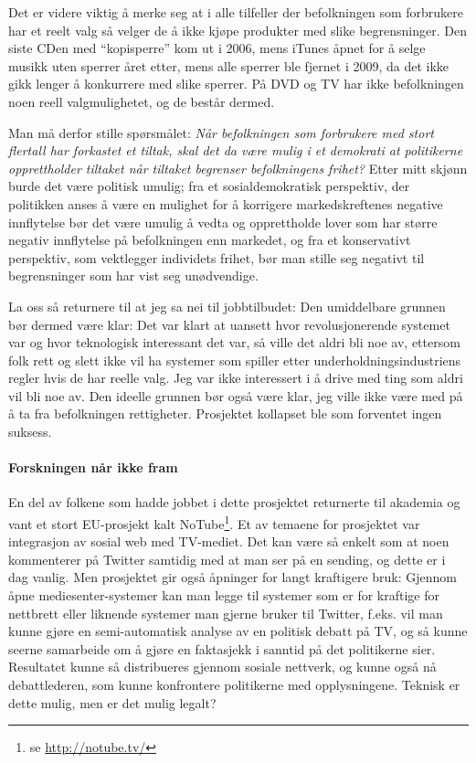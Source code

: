 \documentclass[11pt,norsk,a4paper]{article}
\begin{document}
Det er videre viktig å merke seg at i alle tilfeller der befolkningen
som forbrukere har et reelt valg så velger de å ikke kjøpe produkter
med slike begrensninger. Den siste CDen med ``kopisperre'' kom ut i
2006\cite{aftkopi}, mens iTunes åpnet for å selge musikk uten sperrer året etter,
mens alle sperrer ble fjernet i 2009\cite{ituneskopi}, da det ikke gikk lenger å
konkurrere med slike sperrer. På DVD og TV har
ikke befolkningen noen reell valgmulighetet, og de består dermed.

Man må derfor stille spørsmålet: \emph{Når befolkningen som forbrukere med
stort flertall har forkastet et tiltak, skal det da være mulig i et
demokrati at politikerne opprettholder tiltaket når tiltaket begrenser
befolkningens frihet?} Etter mitt skjønn burde det være politisk
umulig; fra et sosialdemokratisk perspektiv, der politikken anses å
være en mulighet for å korrigere markedskreftenes negative innflytelse
bør det være umulig å vedta og opprettholde lover som har større
negativ innflytelse på befolkningen enn markedet, og fra et
konservativt perspektiv, som vektlegger individets frihet, bør man
stille seg negativt til begrensninger som har vist seg unødvendige.

La oss så returnere til at jeg sa nei til jobbtilbudet: Den
umiddelbare grunnen bør dermed være klar: Det var klart at uansett
hvor revolusjonerende systemet var og hvor teknologisk interessant det
var, så ville det aldri bli noe av, ettersom folk rett og slett ikke
vil ha systemer som spiller etter underholdningsindustriens regler
hvis de har reelle valg. Jeg var ikke interessert i å drive med ting
som aldri vil bli noe av. Den ideelle grunnen bør også være klar, jeg
ville ikke være med på å ta fra befolkningen rettigheter. Prosjektet
kollapset ble som forventet ingen suksess.

\paragraph{Forskningen når ikke fram}

En del av folkene som hadde jobbet i dette prosjektet returnerte til
akademia og vant et stort EU-prosjekt kalt
NoTube\footnote{se \url{http://notube.tv/}}. Et av temaene for
prosjektet var integrasjon av sosial web med TV-mediet. Det kan være
så enkelt som at noen kommenterer på Twitter samtidig med at man ser
på en sending, og dette er i dag vanlig. Men prosjektet gir også
åpninger for langt kraftigere bruk: Gjennom åpne mediesenter-systemer
kan man legge til systemer som er for kraftige for nettbrett eller
liknende systemer man gjerne bruker til Twitter, f.eks. vil man kunne
gjøre en semi-automatisk analyse av en politisk debatt på TV, og så
kunne seerne samarbeide om å gjøre en faktasjekk i sanntid på det
politikerne sier. Resultatet kunne så distribueres gjennom sosiale
nettverk, og kunne også nå debattlederen, som kunne konfrontere
politikerne med opplysningene. Teknisk er dette mulig, men er det
mulig legalt?
\end{document}
